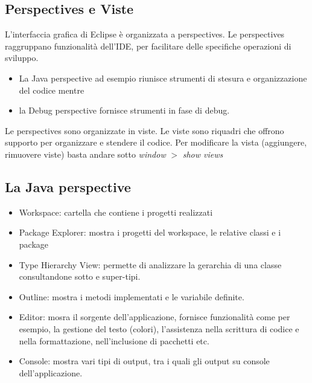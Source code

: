 \documentclass{article}
\begin{document}
\subsection{Perspectives e Viste}
L'interfaccia grafica di Eclipse \`e organizzata a  perspectives. Le perspectives raggruppano funzionalità dell'IDE, per facilitare delle specifiche  operazioni di sviluppo. 
\begin{itemize}
\item La Java perspective ad esempio riunisce strumenti di stesura e organizzazione 
del codice mentre 
\item la Debug perspective fornisce strumenti in fase di debug.
\end{itemize}
Le perspectives sono organizzate in viste. Le viste sono riquadri che offrono supporto per organizzare e stendere il codice. Per modificare la vista (aggiungere, rimuovere viste) basta andare sotto 
\textit{window} $>$ \textit{show views}


\subsection{La Java perspective}
\begin{itemize}
\item Workspace: cartella che contiene i progetti realizzati
\item Package Explorer: mostra i progetti del workspace, le relative classi e i package 
\item Type Hierarchy View: permette di analizzare la gerarchia di una classe consultandone sotto e super-tipi.
\item Outline: mostra i metodi  implementati e le variabile  definite.
\item Editor: mosra il sorgente dell'applicazione, fornisce funzionalit\` a come per esempio, la gestione del testo (colori), l'assistenza nella scrittura di codice e nella formattazione, nell'inclusione di pacchetti etc.
\item Console: mostra vari tipi di output, tra i quali gli output su console dell'applicazione.
\end{itemize}

\end{document}

